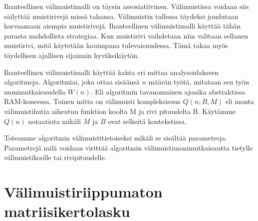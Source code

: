 \documentclass[finnish]{tktltiki2}
\theoremstyle{definition}
\theoremstyle{remark}
\begin{document}
Ihanteellinen välimuistimalli on täysin assosiatiivinen.
Välimuistissa voidaan siis säilyttää muistirivejä missä tahansa.
Välimuistin tullessa täydeksi joudutaan korvaamaan aiempia muistirivejä.
Ihanteellinen välimuistimalli käyttää tähän parasta mahdollista strategiaa.
Kun muistirivi vaihdetaan niin valitaan sellanen muistirivi, mitä käytetään kauimpana tulevaisuudessa. %
Tämä takaa myös täydellisen ajallisen sijainnin hyväksikäytön.

Ihanteellinen välimuistimalli käyttää kahta eri mittaa analysoidakseen algoritmeja.
Algoritmiai, joka ottaa sisäänsä $n$ määrän työtä, mitataan sen työn monimutkaisuudella $W(n)$.
Eli algoritmin tavanomainen ajoaika abstraktissa RAM-koneessa. %
Toinen mitta on välimuisti kompleksisuus $Q(n;B,M)$ eli monta välimuistihutia
aiheutuu funktion koolta M ja rivi pituudelta B.
Käytämme $Q(n)$ notaatiota mikäli $M$ ja $B$ ovat selkeitä kontekstissa.

Toteamme algoritmin välimuistitietoiseksi mikäli se sisältää parametreja. Parametrejä milä voidaan
virittää algoritmin välimuistimonimutkaisuutta tietylle välimuistikoolle tai rivipituudelle. %


\section{Välimuistiriippumaton matriisikertolasku}


%
%
% 
%



\end{document}
